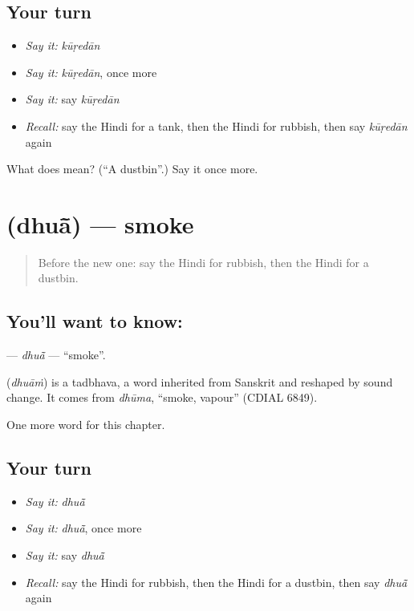 \subsection*{Your turn}
\begin{itemize}
\raggedright
  \item \emph{Say it:} \emph{kūṛedān}
  \item \emph{Say it:} \emph{kūṛedān}, once more
  \item \emph{Say it:} say \emph{kūṛedān}
  \item \emph{Recall:} say the Hindi for a tank, then the Hindi for rubbish, then say \emph{kūṛedān} again
\end{itemize}

\begin{tcolorbox}[breakable,colback=teal!4,colframe=teal!35!black,title={Before you move on}]
What does  mean? (\textquotedblleft{}A dustbin\textquotedblright{}.) Say it once more.
\end{tcolorbox}
\section[\texorpdfstring{\hi{धुआँ} (dhuā̃)}{धुआँ (dhuā̃)}]{ (dhuā̃) — smoke}

\label{lesson:HI-C268-dhua}



\begin{quote}
Before the new one: say the Hindi for rubbish, then the Hindi for a dustbin.
\end{quote}

\subsection*{You'll want to know: }
\textbf{} — \emph{dhuā̃} — \textquotedblleft{}smoke\textquotedblright{}.

\begin{cousinweb}
\textbf{} (\emph{dhuāṁ}) is a tadbhava, a word inherited from Sanskrit and reshaped by sound change. It comes from \emph{dhūma}, \textquotedblleft{}smoke, vapour\textquotedblright{} (CDIAL 6849).
\end{cousinweb}

\begin{grammarlens}[title={What you've built}]
One more word for this chapter.
\end{grammarlens}

\subsection*{Your turn}
\begin{itemize}
\raggedright
  \item \emph{Say it:} \emph{dhuā̃}
  \item \emph{Say it:} \emph{dhuā̃}, once more
  \item \emph{Say it:} say \emph{dhuā̃}
  \item \emph{Recall:} say the Hindi for rubbish, then the Hindi for a dustbin, then say \emph{dhuā̃} again
\end{itemize}

